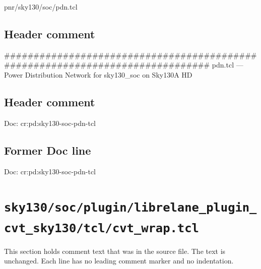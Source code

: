 \begin{relocated}{pnr/sky130/soc/pdn.tcl}

\subsection*{Header comment}

\begin{textblock}
##############################################################################
pdn.tcl — Power Distribution Network for sky130_soc on Sky130A HD
\end{textblock}

\subsection*{Header comment}

\begin{textblock}
Doc: cr:pd:sky130-soc-pdn-tcl
\end{textblock}

\subsection*{Former Doc line}

\begin{textblock}
Doc: cr:pd:sky130-soc-pdn-tcl
\end{textblock}

\end{relocated}

\section{\texttt{sky130/soc/plugin/librelane\_plugin\_cvt\_sky130/tcl/cvt\_wrap.tcl}}\label{tm:pd:sky130-soc-plugin-librelane-cvt-tcl-wrap}

This section holds comment text that was in the source file. The text is unchanged. Each line has no leading comment marker and no indentation.

